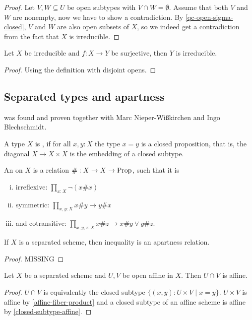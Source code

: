 \begin{proof}
  Let $V, W \subseteq U$ be open subtypes with $V \cap W = \emptyset$.
  Assume that both $V$ and $W$ are nonempty,
  now we have to show a contradiction.
  By \cref{qc-open-sigma-closed},
  $V$ and $W$ are also open subsets of $X$,
  so we indeed get a contradiction
  from the fact that $X$ is irreducible.
\end{proof}

\begin{lemma}%
  Let $X$ be irreducible and $f:X\to Y$ be surjective,
  then $Y$ is irreducible.
\end{lemma}

\begin{proof}
  Using the definition with disjoint opens.
\end{proof}

\subsection{Separated types and apartness}

 was found and proven together with Marc Nieper-Wißkirchen and Ingo Blechschmidt.

\begin{definition}%
  A type $X$ is , if for all $x,y:X$
  the type $x=y$ is a closed proposition,
  that is,
  the diagonal $X \to X\times X$ is the embedding of a closed subtype.
\end{definition}

\begin{definition}
  An  on $X$ is a relation $\#:X\to X\to \mathrm{Prop}$, such that it is
  \begin{enumerate}[(i)]
  \item irreflexive: $\prod_{x:X}\neg(x \# x)$
  \item symmetric: $\prod_{x,y:X} x\# y \to y\# x$
  \item and cotransitive: $\prod_{x,y,z:X} x\# z \to x\# y \vee y\# z$.
  \end{enumerate}
\end{definition}

\begin{proposition}%
  \label{separated-inequality-apartness}
  If $X$ is a separated scheme, then inequality is an apartness relation.
\end{proposition}

\begin{proof}
  MISSING
\end{proof}

\begin{proposition}%
  Let $X$ be a separated scheme and $U,V$ be open affine in $X$.
  Then $U\cap V$ is affine.
\end{proposition}

\begin{proof}
  $U\cap V$ is equivalently the closed subtype $\{(x,y) : U\times V\mid x=y\}$.
  $U\times V$ is affine by \cref{affine-fiber-product} and a closed subtype of an affine scheme is affine by \cref{closed-subtype-affine}.
\end{proof}
